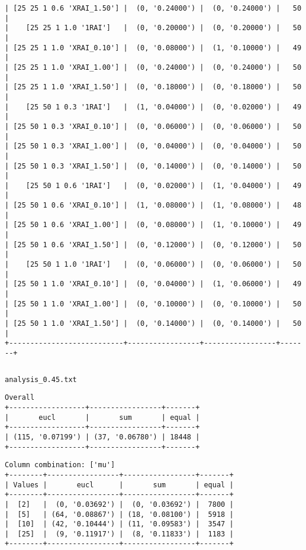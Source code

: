 \documentclass{article}
\begin{document}
\begin{verbatim}
| [25 25 1 0.6 'XRAI_1.50'] |  (0, '0.24000') |  (0, '0.24000') |   50  |
|    [25 25 1 1.0 '1RAI']   |  (0, '0.20000') |  (0, '0.20000') |   50  |
| [25 25 1 1.0 'XRAI_0.10'] |  (0, '0.08000') |  (1, '0.10000') |   49  |
| [25 25 1 1.0 'XRAI_1.00'] |  (0, '0.24000') |  (0, '0.24000') |   50  |
| [25 25 1 1.0 'XRAI_1.50'] |  (0, '0.18000') |  (0, '0.18000') |   50  |
|    [25 50 1 0.3 '1RAI']   |  (1, '0.04000') |  (0, '0.02000') |   49  |
| [25 50 1 0.3 'XRAI_0.10'] |  (0, '0.06000') |  (0, '0.06000') |   50  |
| [25 50 1 0.3 'XRAI_1.00'] |  (0, '0.04000') |  (0, '0.04000') |   50  |
| [25 50 1 0.3 'XRAI_1.50'] |  (0, '0.14000') |  (0, '0.14000') |   50  |
|    [25 50 1 0.6 '1RAI']   |  (0, '0.02000') |  (1, '0.04000') |   49  |
| [25 50 1 0.6 'XRAI_0.10'] |  (1, '0.08000') |  (1, '0.08000') |   48  |
| [25 50 1 0.6 'XRAI_1.00'] |  (0, '0.08000') |  (1, '0.10000') |   49  |
| [25 50 1 0.6 'XRAI_1.50'] |  (0, '0.12000') |  (0, '0.12000') |   50  |
|    [25 50 1 1.0 '1RAI']   |  (0, '0.06000') |  (0, '0.06000') |   50  |
| [25 50 1 1.0 'XRAI_0.10'] |  (0, '0.04000') |  (1, '0.06000') |   49  |
| [25 50 1 1.0 'XRAI_1.00'] |  (0, '0.10000') |  (0, '0.10000') |   50  |
| [25 50 1 1.0 'XRAI_1.50'] |  (0, '0.14000') |  (0, '0.14000') |   50  |
+---------------------------+-----------------+-----------------+-------+
\end{verbatim}

\begin{verbatim}

\end{verbatim}

\newpage
\verb|analysis_0.45.txt|
\begin{verbatim}
Overall
+------------------+-----------------+-------+
|       eucl       |       sum       | equal |
+------------------+-----------------+-------+
| (115, '0.07199') | (37, '0.06780') | 18448 |
+------------------+-----------------+-------+
\end{verbatim}

\begin{verbatim}
Column combination: ['mu']
+--------+-----------------+-----------------+-------+
| Values |       eucl      |       sum       | equal |
+--------+-----------------+-----------------+-------+
|  [2]   |  (0, '0.03692') |  (0, '0.03692') |  7800 |
|  [5]   | (64, '0.08867') | (18, '0.08100') |  5918 |
|  [10]  | (42, '0.10444') | (11, '0.09583') |  3547 |
|  [25]  |  (9, '0.11917') |  (8, '0.11833') |  1183 |
+--------+-----------------+-----------------+-------+
\end{verbatim}
\end{document}
